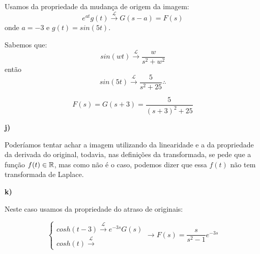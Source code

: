 Usamos da propriedade da mudança de origem da imagem:
\begin{equation*}
    e^{at}g(t) \xrightarrow{\mathcal{L}} G(s-a) = F(s)
\end{equation*}
onde $a=-3$ e $g(t) = sin(5t)$.

Sabemos que:
\begin{equation*}
     sin(wt) \xrightarrow{\mathcal{L}} \frac{w}{s^2+w^2}
\end{equation*}
então 
\begin{equation*}
     sin(5t) \xrightarrow{\mathcal{L}} \frac{5}{s^2+25} \therefore
\end{equation*}

\begin{equation*}
    \boxed{F(s) = G(s+3) = \frac{5}{(s+3)^2+25}}
\end{equation*}

\textbf{j)}

Poderíamos tentar achar a imagem utilizando da linearidade e a da propriedade da derivada do original, todavia, nas definições da transformada, se pede que a função $f(t)\in\mathbb{R}$, mas como não é o caso, podemos dizer que essa $f(t)$ não tem transformada de Laplace.

\textbf{k)}

Neste caso usamos da propriedade do atraso de originais:

\begin{equation*}
    \begin{cases}
    cosh(t-3) \xrightarrow{\mathcal{L}} e^{-3s}G(s)\\
    cosh(t)\xrightarrow{\mathcal{L}} 
    \end{cases}\longrightarrow \boxed{F(s) = \frac{s}{s^2-1}e^{-3s}}
\end{equation*}

